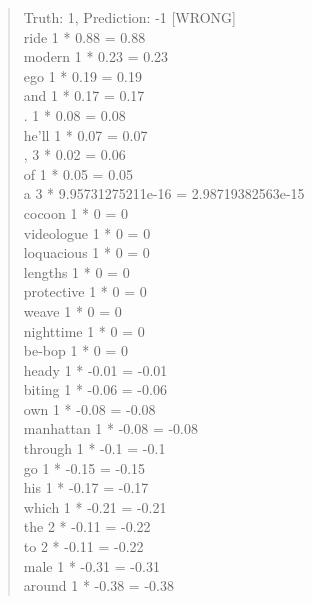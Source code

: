 \documentclass[12pt]{article}
\begin{document}
\begin{enumerate}[label=(\alph*)]
\begin{enumerate}[label=\arabic*.]
\begin{quote}
Truth: 1, Prediction: -1 [WRONG] \\
ride                          1 * 0.88 = 0.88 \\
modern                        1 * 0.23 = 0.23 \\
ego                           1 * 0.19 = 0.19 \\
and                           1 * 0.17 = 0.17 \\
.                             1 * 0.08 = 0.08 \\
he'll                         1 * 0.07 = 0.07 \\
,                             3 * 0.02 = 0.06 \\
of                            1 * 0.05 = 0.05 \\
a                             3 * 9.95731275211e-16 = 2.98719382563e-15 \\
cocoon                        1 * 0 = 0 \\
videologue                    1 * 0 = 0 \\
loquacious                    1 * 0 = 0 \\ 
lengths                       1 * 0 = 0 \\ 
protective                    1 * 0 = 0 \\
weave                         1 * 0 = 0 \\ 
nighttime                     1 * 0 = 0 \\ 
be-bop                        1 * 0 = 0 \\
heady                         1 * -0.01 = -0.01 \\
biting                        1 * -0.06 = -0.06 \\
own                           1 * -0.08 = -0.08 \\
manhattan                     1 * -0.08 = -0.08 \\
through                       1 * -0.1 = -0.1 \\
go                            1 * -0.15 = -0.15 \\
his                           1 * -0.17 = -0.17 \\
which                         1 * -0.21 = -0.21 \\
the                           2 * -0.11 = -0.22 \\
to                            2 * -0.11 = -0.22 \\
male                          1 * -0.31 = -0.31 \\
around                        1 * -0.38 = -0.38

\end{quote}
\end{enumerate}
\end{enumerate}
\end{document}
